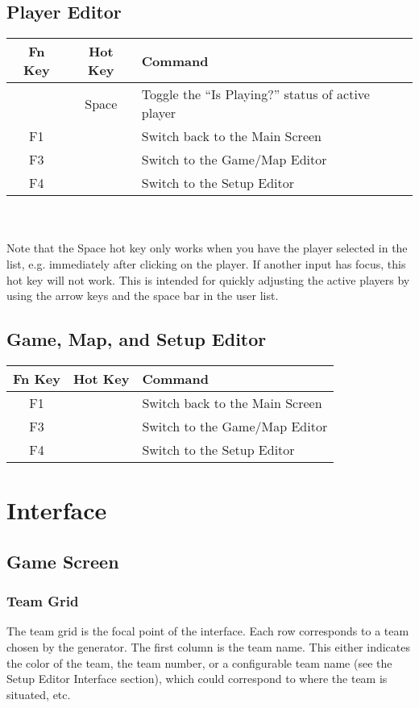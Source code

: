 \documentclass[pdftex,10pt,a4paper]{report}
\begin{document}
\section{Player Editor}
\begin{tabular}{c|c|l}
Fn Key & Hot Key & Command \\
\hline
& Space & Toggle the ``Is Playing?'' status of active player \\
F1 & & Switch back to the Main Screen \\
F3 & & Switch to the Game/Map Editor \\
F4 & & Switch to the Setup Editor \\
\end{tabular}
\\
\\
Note that the Space hot key only works when you have the player selected in the list, e.g. immediately after clicking on the player.  If another input has focus, this hot key will not work.  This is intended for quickly adjusting the active players by using the arrow keys and the space bar in the user list.

\section{Game, Map, and Setup Editor}
\begin{tabular}{c|c|l}
Fn Key & Hot Key & Command \\
\hline
F1 & & Switch back to the Main Screen \\
F3 & & Switch to the Game/Map Editor \\
F4 & & Switch to the Setup Editor \\
\end{tabular}

\chapter{Interface}
\section{Game Screen}
\subsection{Team Grid}
The team grid is the focal point of the interface.  Each row corresponds to a team chosen by the generator.  The first column is the team name.  This either indicates the color of the team, the team number, or a configurable team name (see the Setup Editor Interface section), which could correspond to where the team is situated, etc.
\end{document}
